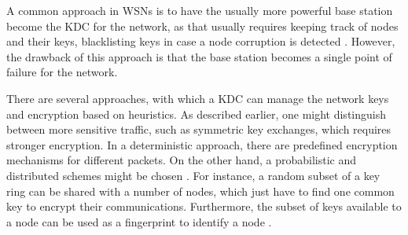 \documentclass[12pt,a4paper,twoside]{report}
\begin{document}
A common approach in WSNs is to have the usually more powerful base station become the KDC for the network, as that usually requires keeping track of nodes and their keys, blacklisting keys in case a node corruption is detected \cite{sen:2009}. However, the drawback of this approach is that the base station becomes a single point of failure for the network.\par
There are several approaches, with which a KDC can manage the network keys and encryption based on heuristics. As described earlier, one might distinguish between more sensitive traffic, such as symmetric key exchanges, which requires stronger encryption. In a deterministic approach, there are predefined encryption mechanisms for different packets. On the other hand, a probabilistic and distributed schemes might be chosen \cite{sen:2009}. For instance, a random subset of a key ring can be shared with a number of nodes, which just have to find one common key to encrypt their communications. Furthermore, the subset of keys available to a node can be used as a fingerprint to identify a node \cite{sen:2009}.\par
\end{document}
